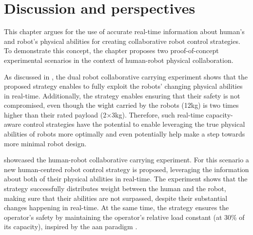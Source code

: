 

\section{Discussion and perspectives}
\label{sec:discussion_perspectives_carrying}
This chapter argues for the use of accurate real-time information about human's and robot's physical abilities for creating collaborative robot control strategies. To demonstrate this concept, the chapter proposes two proof-of-concept experimental scenarios in the context of human-robot physical collaboration. 

As discussed in , the dual robot collaborative carrying experiment shows that the proposed strategy enables to fully exploit the robots' changing physical abilities in real-time. Additionally, the strategy enables ensuring that their safety is not compromised, even though the wight carried by the robots (12kg) is two times higher than their rated payload (2$\times$3kg). Therefore, such real-time capacity-aware control strategies have the potential to enable leveraging the true physical abilities of robots more optimally and even potentially help make a step towards more minimal robot design.

 showcased the human-robot collaborative carrying experiment. For this scenario a new human-centred robot control strategy is proposed, leveraging the information about both of their physical abilities in real-time. The experiment shows that the strategy successfully distributes weight between the human and the robot, making sure that their abilities are not surpassed, despite their substantial changes happening in real-time. At the same time, the strategy ensures the operator's safety by maintaining the operator's relative load constant (at 30\% of its capacity), inspired by the \gls{aan} paradigm \cite{carmichael2013admittance}.

